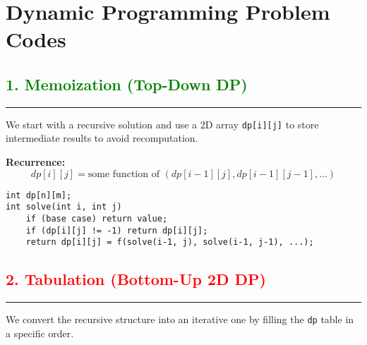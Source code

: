 % 
% 
\section*{Dynamic Programming Problem Codes}
\subsection*{\textcolor{green}{\textbf{1. Memoization (Top-Down DP)}}}
\rule{\linewidth}{0.5mm}

We start with a recursive solution and use a 2D array \texttt{dp[i][j]} to store intermediate results to avoid recomputation.

\textbf{Recurrence:}
\[
dp[i][j] = \text{some function of }( dp[i-1][j], dp[i-1][j-1], \ldots)
\]
\begin{Verbatim}[fontsize=\small]
int dp[n][m];
int solve(int i, int j)
    if (base case) return value;
    if (dp[i][j] != -1) return dp[i][j];
    return dp[i][j] = f(solve(i-1, j), solve(i-1, j-1), ...);

\end{Verbatim}

\subsection*{\textcolor{red}{\textbf{2. Tabulation (Bottom-Up 2D DP)}}}
\rule{\linewidth}{0.5mm}

We convert the recursive structure into an iterative one by filling the \texttt{dp} table in a specific order.

